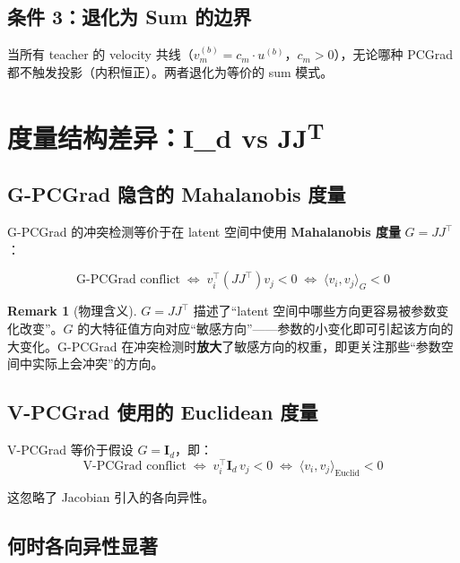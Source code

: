 \documentclass[11pt,a4paper]{article}
\theoremstyle{definition}
\newtheorem{remark}{Remark}
\begin{document}
\subsection{条件 3：退化为 Sum 的边界}

当所有 teacher 的 velocity 共线（$v_m^{(b)} = c_m \cdot u^{(b)}$，$c_m > 0$），无论哪种 PCGrad 都不触发投影（内积恒正）。两者退化为等价的 sum 模式。

\section{度量结构差异：I\_d vs JJ\textsuperscript{T}}
\label{sec:metric}

\subsection{G-PCGrad 隐含的 Mahalanobis 度量}

G-PCGrad 的冲突检测等价于在 latent 空间中使用 \textbf{Mahalanobis 度量} $G = JJ^\top$：

\begin{equation}
\text{G-PCGrad conflict} \;\Leftrightarrow\; v_i^\top (JJ^\top) v_j < 0
\;\Leftrightarrow\; \langle v_i, v_j\rangle_{G} < 0
\end{equation}

\begin{remark}[物理含义]
$G = JJ^\top$ 描述了``latent 空间中哪些方向更容易被参数变化改变''。$G$ 的大特征值方向对应``敏感方向''——参数的小变化即可引起该方向的大变化。G-PCGrad 在冲突检测时\textbf{放大}了敏感方向的权重，即更关注那些``参数空间中实际上会冲突''的方向。
\end{remark}

\subsection{V-PCGrad 使用的 Euclidean 度量}

V-PCGrad 等价于假设 $G = \bm{I}_d$，即：
\begin{equation}
\text{V-PCGrad conflict} \;\Leftrightarrow\; v_i^\top \bm{I}_d\, v_j < 0
\;\Leftrightarrow\; \langle v_i, v_j\rangle_{\mathrm{Euclid}} < 0
\end{equation}

这忽略了 Jacobian 引入的各向异性。

\subsection{何时各向异性显著}
\end{document}
